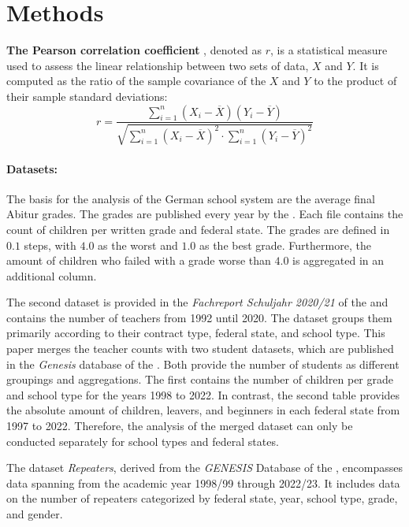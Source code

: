 \section*{Methods}



\textbf{The Pearson correlation coefficient} \cite{rodgers_thirteen_1988}, denoted as $r$, is a statistical measure used to assess the linear relationship between two sets of data, $X$ and $Y$. It is computed as the ratio of the sample covariance of the $X$ and $Y$ to the product of their sample standard deviations:
\begin{equation}
    r = \frac{\sum_{i=1}^n (X_i - \overline{X}) (Y_i - \overline{Y})}{\sqrt{\sum_{i=1}^n(X_i-\overline{X})^2 \cdot \sum_{i=1}^n(Y_i-\overline{Y})^2}}
\end{equation}


\paragraph{Datasets:}
The basis for the analysis of the German school system are the average final Abitur grades. The grades are published every year by the \citeauthor{kultusminister_konferenz_abiturnoten_nodate}. Each file contains the count of children per written grade and federal state. The grades are defined in $0.1$ steps, with $4.0$ as the worst and $1.0$ as the best grade. Furthermore, the amount of children who failed with a grade worse than $4.0$ is aggregated in an additional column.

The second dataset is provided in the \textit{Fachreport Schuljahr 2020/21} of the \citeauthor{statistische_bundesamt_allgemeinbildende_2022} and contains the number of teachers from 1992 until 2020. The dataset groups them primarily according to their contract type, federal state, and school type. This paper merges the teacher counts with two student datasets, which are published in the \textit{Genesis} database of the \citeauthor{statistische_bundesamt_statistisches_2023}. Both provide the number of students as different groupings and aggregations. The first contains the number of children per grade and school type  for the years 1998 to 2022. In contrast, the second table provides the absolute amount of children, leavers, and beginners in each federal state from 1997 to 2022. Therefore, the analysis of the merged dataset can only be conducted separately for school types and federal states.

The dataset \textit{Repeaters}, derived from the \textit{GENESIS} Database of the \citeauthor{statistische_bundesamt_statistisches_2023}, encompasses data spanning from the academic year 1998/99 through 2022/23.  It includes data on the number of repeaters categorized by federal state, year, school type, grade, and gender. 

